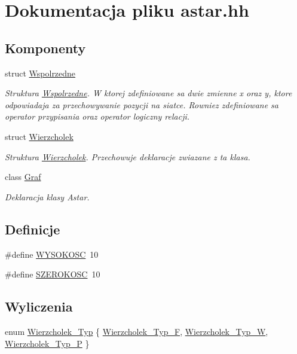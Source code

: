 \hypertarget{astar_8hh}{\section{\-Dokumentacja pliku astar.\-hh}
\label{astar_8hh}
}
\subsection*{\-Komponenty}
\begin{DoxyCompactItemize}
\item 
struct \hyperlink{struct_wspolrzedne}{\-Wspolrzedne}
\begin{DoxyCompactList}\small\item\em \-Struktura \hyperlink{struct_wspolrzedne}{\-Wspolrzedne}. \-W ktorej zdefiniowane sa dwie zmienne x oraz y, ktore odpowiadaja za przechowywanie pozycji na siatce. \-Rowniez zdefiniowane sa operator przypisania oraz operator logiczny relacji. \end{DoxyCompactList}\item 
struct \hyperlink{struct_wierzcholek}{\-Wierzcholek}
\begin{DoxyCompactList}\small\item\em \-Struktura \hyperlink{struct_wierzcholek}{\-Wierzcholek}. \-Przechowuje deklaracje zwiazane z ta klasa. \end{DoxyCompactList}\item 
class \hyperlink{class_graf}{\-Graf}
\begin{DoxyCompactList}\small\item\em \-Deklaracja klasy \-Astar. \end{DoxyCompactList}\end{DoxyCompactItemize}
\subsection*{\-Definicje}
\begin{DoxyCompactItemize}
\item 
\#define \hyperlink{astar_8hh_a771583e9e87d083150a9a329f44c5f7e}{\-W\-Y\-S\-O\-K\-O\-S\-C}~10
\item 
\#define \hyperlink{astar_8hh_acd0b90760065a9ea20a0bf6e9f01289c}{\-S\-Z\-E\-R\-O\-K\-O\-S\-C}~10
\end{DoxyCompactItemize}
\subsection*{\-Wyliczenia}
\begin{DoxyCompactItemize}
\item 
enum \hyperlink{astar_8hh_af54d448689b4613c3715929ca2a914a2}{\-Wierzcholek\-\_\-\-Typ} \{ \hyperlink{astar_8hh_af54d448689b4613c3715929ca2a914a2a5021d874406808a1d631fdfed6b05e5e}{\-Wierzcholek\-\_\-\-Typ\-\_\-\-F}, 
\hyperlink{astar_8hh_af54d448689b4613c3715929ca2a914a2a2912fc7f312fe8def0f224eac198f59e}{\-Wierzcholek\-\_\-\-Typ\-\_\-\-W}, 
\hyperlink{astar_8hh_af54d448689b4613c3715929ca2a914a2a8dcf1159c22e0950df6e214e2a39ac88}{\-Wierzcholek\-\_\-\-Typ\-\_\-\-P}
 \}
\end{DoxyCompactItemize}



